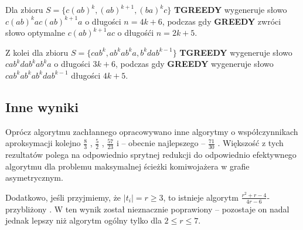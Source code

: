 Dla zbioru $S = \{c(ab)^k, (ab)^{k+1},(ba)^kc\}$ \textbf{TGREEDY} wygeneruje słowo $c(ab)^{k}ac(ab)^{k+1}a$ o długości $n=4k+6$, podczas gdy \textbf{GREEDY} zwróci słowo optymalne
$c(ab)^{k+1}ac$ o długośći $n=2k+5$. 

Z kolei dla zbioru $S = \{cab^k, ab^kab^ka, b^kdab^{k-1} \}$ \textbf{TGREEDY} wygeneruje słowo $cab^kdab^kab^ka$ o długości $3k+6$, podczas gdy 
\textbf{GREEDY} wygeneruje słowo $cab^kab^kab^kdab^{k-1}$ długości $4k+5$.

\subsection{Inne wyniki}

Oprócz algorytmu zachłannego opracowywano inne algorytmy o współczynnikach aproksymacji kolejno $\frac{8}{3}$ \citep{armen19962}, $\frac{5}{2}$ \citep{kaplan2005approximation, sweedyk2000boldmath}, $\frac{57}{23}$ \citep{mucha2013lyndon} i -- obecnie najlepszego -- $\frac{71}{30}$ \citep{paluch2014better}.
Większość z tych rezultatów polega na odpowiednio sprytnej redukcji do odpowiednio efektywnego algorytmu dla problemu maksymalnej ścieżki komiwojażera w grafie asymetrycznym.

Dodatkowo, jeśli przyjmiemy, że $|t_i| = r \ge 3$, to istnieje algorytm $\frac{r^2 + r - 4}{4r - 6}$-przybliżony \citep{golovnev2013approximating}. W \citet{braquelaire2018improving} ten wynik został nieznacznie poprawiony -- pozostaje on nadal jednak lepszy niż algorytm ogólny tylko dla $2 \le r \le 7$.
